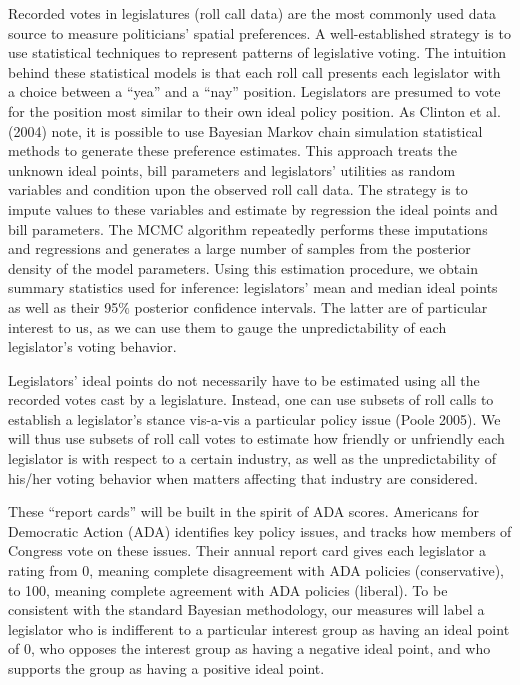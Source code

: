 \documentclass[12pt]{article}
\begin{document}
Recorded votes in legislatures (roll call data) are the most commonly used data source to measure politicians' spatial preferences. A well-established strategy is to use statistical techniques to represent patterns of legislative voting. The intuition behind these statistical models is that each roll call presents each legislator with a choice between a ``yea'' and a ``nay'' position. Legislators are presumed to vote for the position most similar to their own ideal policy position. As Clinton et al. (2004) note, it is possible to use Bayesian Markov chain simulation statistical methods to generate these preference estimates. This approach treats the unknown ideal points, bill parameters and legislators' utilities as random variables and condition upon the observed roll call data. The strategy is to impute values to these variables and estimate by regression the ideal points and bill parameters. The MCMC algorithm repeatedly performs these imputations and regressions and generates a large number of samples from the posterior density of the model parameters. Using this estimation procedure, we obtain summary statistics used for inference: legislators' mean and median ideal points as well as their 95$\%$ posterior confidence intervals. The latter are of particular interest to us, as we can use them to gauge the unpredictability of each legislator's voting behavior.

Legislators' ideal points do not necessarily have to be estimated using all the recorded votes cast by a legislature. Instead, one can use subsets of roll calls to establish a legislator's stance vis-a-vis a particular policy issue (Poole 2005). We will thus use subsets of roll call votes to estimate how friendly or unfriendly each legislator is with respect to a certain industry, as well as the unpredictability of his/her voting behavior when matters affecting that industry are considered.

These ``report cards'' will be built in the spirit of ADA scores. Americans for Democratic Action (ADA) identifies key policy issues, and tracks how members of Congress vote on these issues. Their annual report card gives each legislator a rating from 0, meaning complete disagreement with ADA policies (conservative), to 100, meaning complete agreement with ADA policies (liberal). To be consistent with the standard Bayesian methodology, our measures will label a legislator who is indifferent to a particular interest group as having an ideal point of 0, who opposes the interest group as having a negative ideal point, and who supports the group as having a positive ideal point.
\end{document}
